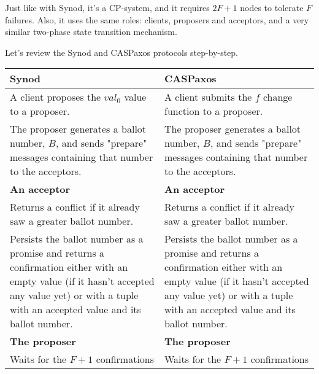 \documentclass[12pt]{article}
\theoremstyle{definition}
\begin{document}
Just like with Synod, it's a CP-system, and it requires $2F+1$ nodes to tolerate $F$ failures. Also, it uses the same roles: clients, proposers and acceptors, and a very similar two-phase state transition mechanism.

Let's review the Synod and CASPaxos protocols step-by-step.

\begin{center}
\begin{longtable}{p{15em}|p{15em}} 
  \hline
  {\bf Synod}
  &
  {\bf CASPaxos} \\ 
  \hline
  \endfirsthead

  \endhead
  \endfoot
  \endlastfoot
  
  A client proposes the $val_0$ value to a proposer.
  &
  A client submits the $f$ change function to a proposer. \\
  
  \hline
  
  The proposer generates a ballot number, $B$, and sends "prepare" messages containing that number to the acceptors.
  &
  The proposer generates a ballot number, $B$, and sends "prepare" messages containing that number to the acceptors. \\
  
  \hline
  
  {\bf An acceptor}
  &
  {\bf An acceptor} \\[6pt]
  
  
  Returns a conflict if it already saw a greater ballot number.
  &
  Returns a conflict if it already saw a greater ballot number.
  \\[6pt]
  
  
  Persists the ballot number as a promise and returns a confirmation either with an empty value (if it hasn't accepted any value yet) or with a tuple with an accepted value and its ballot number.
  &
  Persists the ballot number as a promise and returns a confirmation either with an empty value (if it hasn't accepted any value yet) or with a tuple with an accepted value and its ballot number.
  \\[6pt]
  
  \hline

  {\bf The proposer}
  &
  {\bf The proposer} \\[6pt]
  

  Waits for the $F+1$ confirmations
  &
  Waits for the $F+1$ confirmations \\[6pt]
  

\end{longtable}
\end{center}
\end{document}

